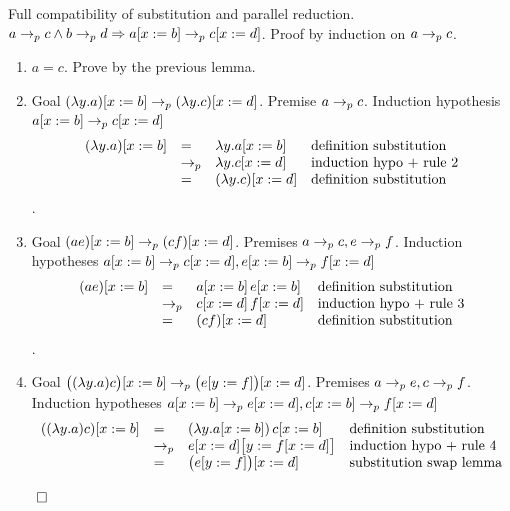 \documentclass{article}
\begin{document}
\begin{lemma}
  Full compatibility of substitution and parallel reduction.
  $a \to_{p} c \land b \to_{p} d  \Rightarrow a[x := b] \to_{p} c[x := d]$. Proof
  by induction on $a \to_{p} c $.
  \begin{enumerate}
  \item
    $a=c$. Prove by the previous lemma.
  \item
    Goal $(\lambda y.a) [x := b] \to_{p} (\lambda y.c) [x := d]$.
    Premise $a \to_{p} c$. Induction
    hypothesis $a[x := b] \to_{p} c[x := d]$
    $$
    \begin{array}{llll}
      (\lambda y.a)[x := b]  &=& \lambda y.a [x := b] &\text{definition substitution} \\
                             &\to_{p}& \lambda y.c[x := d]  &\text{induction hypo + rule 2} \\
                             &=& (\lambda y.c)[x := d]           &\text{definition substitution}
    \end{array}
    $$.
  \item
    Goal $(a e) [x := b] \to_{p} (c f) [x := d]$.
    Premises $a\to_{p} c, e\to_{p} f$.
    Induction hypotheses
      $a[x := b] \to_{p} c[x := d],
       e[x := b] \to_{p} f[x := d]$
    $$
    \begin{array}{llll}
      (a e)[x := b]  &=& a[x := b]\, e[x := b] &\text{definition substitution}\\
                     &\to_{p}& c[x := d] \, f[x := d] &\text{induction hypo + rule 3} \\
                     &=& (c f)[x := d] &\text{definition substitution}
    \end{array}
    $$.
  \item
    Goal $\big((\lambda y.a) c\big) [x := b] \to_{p} \big(e[y:=f]\big)[x := d]$.
    Premises $a \to_{p} e, c \to_{p} f$.
    Induction hypotheses
      $a[x:=b] \to_{p} e[x := d],
        c[x:=b]  \to_{p} f[x := d]$
    $$
    \begin{array}{llll}
      ((\lambda y.a) c)[x := b]  &=& (\lambda y.a[x := b])\, c[x := b] &
                                                                         \text{definition substitution}\\
                     &\to_{p}& e[x := d]\big[y:=f[x := d]\big] &
                                                                  \text{induction hypo + rule 4} \\
                     &=& \big(e[y:=f]\big)[x := d] &
                                                                  \text{substitution
                                                           swap lemma}
    \end{array}
    $$
  \end{enumerate}
  $\qed$
\end{lemma}
\end{document}
